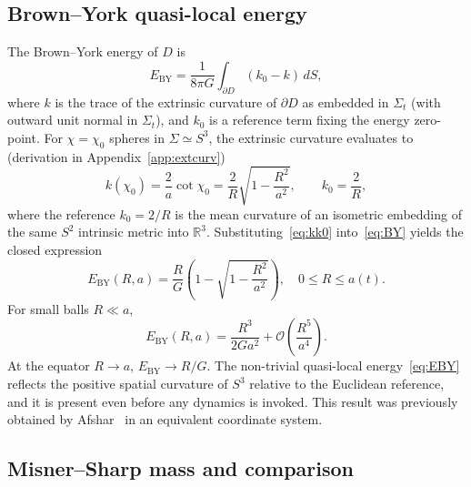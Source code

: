 \documentclass[12pt,a4paper]{article}
\newcommand{\Sig}{\Sigma}           %
\newcommand{\pa}{\partial}          %
\newcommand{\EBY}{E_{\mathrm{BY}}}
\begin{document}
\subsection{Brown--York quasi-local energy}

The Brown--York energy of $D$ is~\cite{BrownYork1993}
\begin{equation}
  \EBY = \frac{1}{8\pi G}\int_{\pa D}(k_0 - k)\,dS,
  \label{eq:BY}
\end{equation}
where $k$ is the trace of the extrinsic curvature of
$\pa D$ as embedded in $\Sig_t$ (with outward unit normal
in $\Sig_t$), and $k_0$ is a reference term fixing the
energy zero-point. For $\chi = \chi_0$ spheres in
$\Sig \simeq S^3$, the extrinsic curvature evaluates to
(derivation in Appendix~\ref{app:extcurv})
\begin{equation}
  k(\chi_0) = \frac{2}{a}\cot\chi_0
  = \frac{2}{R}\sqrt{1 - \frac{R^2}{a^2}},
  \qquad
  k_0 = \frac{2}{R},
  \label{eq:kk0}
\end{equation}
where the reference $k_0 = 2/R$ is the mean curvature of
an isometric embedding of the same $S^2$ intrinsic metric
into $\mathbb{R}^3$. Substituting~\eqref{eq:kk0}
into~\eqref{eq:BY} yields the closed expression
\begin{equation}
  \EBY(R, a) = \frac{R}{G}\!\left(1 - \sqrt{1 - \frac{R^2}{a^2}}\right),
  \quad 0 \leq R \leq a(t).
  \label{eq:EBY}
\end{equation}
For small balls $R\ll a$,
\begin{equation}
  \EBY(R, a) = \frac{R^3}{2Ga^2} + \mathcal{O}\!\left(\frac{R^5}{a^4}\right).
  \label{eq:EBYsmall}
\end{equation}
At the equator $R\to a$, $\EBY \to R/G$. The non-trivial
quasi-local energy~\eqref{eq:EBY} reflects the positive
spatial curvature of $S^3$ relative to the Euclidean
reference, and it is present even before any dynamics is
invoked. This result was previously obtained by
Afshar~\cite{Afshar2009} in an equivalent coordinate system.

\subsection{Misner--Sharp mass and comparison}
\end{document}
